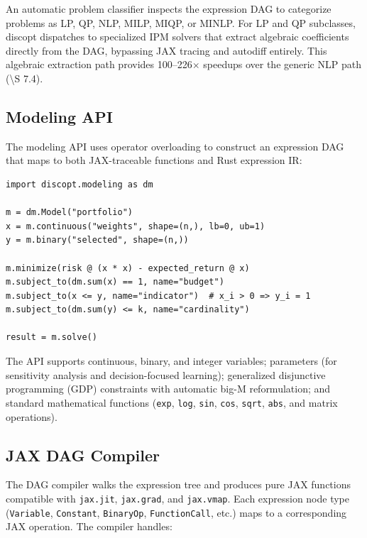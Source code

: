 \documentclass[12pt,preprint]{article}
\begin{document}
An automatic problem classifier inspects the expression DAG to categorize problems as LP, QP, NLP, MILP, MIQP, or MINLP. For LP and QP subclasses, discopt dispatches to specialized IPM solvers that extract algebraic coefficients directly from the DAG, bypassing JAX tracing and autodiff entirely. This algebraic extraction path provides 100--226$\times$ speedups over the generic NLP path (\textbackslash{}S 7.4).

\subsection{Modeling API}
\label{org-modeling-api}
The modeling API uses operator overloading to construct an expression DAG that maps to both JAX-traceable functions and Rust expression IR:


\begin{verbatim}
import discopt.modeling as dm

m = dm.Model("portfolio")
x = m.continuous("weights", shape=(n,), lb=0, ub=1)
y = m.binary("selected", shape=(n,))

m.minimize(risk @ (x * x) - expected_return @ x)
m.subject_to(dm.sum(x) == 1, name="budget")
m.subject_to(x <= y, name="indicator")  # x_i > 0 => y_i = 1
m.subject_to(dm.sum(y) <= k, name="cardinality")

result = m.solve()
\end{verbatim}

The API supports continuous, binary, and integer variables; parameters (for sensitivity analysis and decision-focused learning); generalized disjunctive programming (GDP) constraints with automatic big-M reformulation; and standard mathematical functions (\texttt{exp}, \texttt{log}, \texttt{sin}, \texttt{cos}, \texttt{sqrt}, \texttt{abs}, and matrix operations).

\subsection{JAX DAG Compiler}
\label{org-jax-dag-compiler}
The DAG compiler walks the expression tree and produces pure JAX functions compatible with \texttt{jax.jit}, \texttt{jax.grad}, and \texttt{jax.vmap}. Each expression node type (\texttt{Variable}, \texttt{Constant}, \texttt{BinaryOp}, \texttt{FunctionCall}, etc.) maps to a corresponding JAX operation. The compiler handles:
\end{document}
